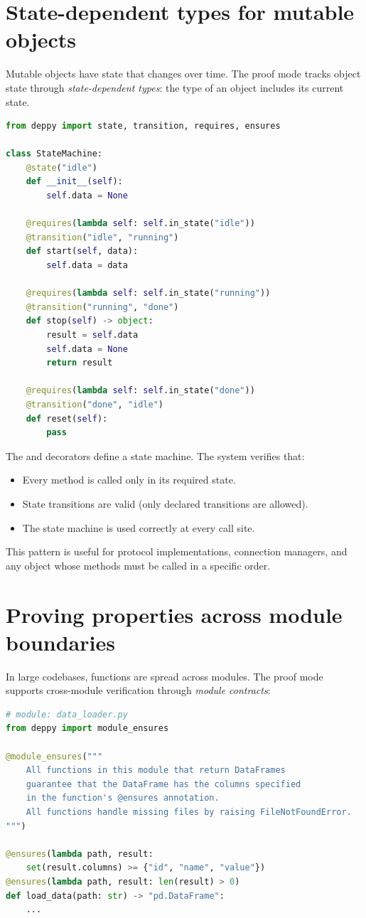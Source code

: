 \documentclass[11pt]{report}
\DeclareRobustCommand{\py}[1]{\texttt{\detokenize{#1}}}
\theoremstyle{definition}
\theoremstyle{plain}
\begin{document}
\section{State-dependent types for mutable objects}

Mutable objects have state that changes over time. The proof mode tracks
object state through \emph{state-dependent types}: the type of an object
includes its current state.

\begin{lstlisting}[style=deppy,language=Python]
from deppy import state, transition, requires, ensures

class StateMachine:
    @state("idle")
    def __init__(self):
        self.data = None

    @requires(lambda self: self.in_state("idle"))
    @transition("idle", "running")
    def start(self, data):
        self.data = data

    @requires(lambda self: self.in_state("running"))
    @transition("running", "done")
    def stop(self) -> object:
        result = self.data
        self.data = None
        return result

    @requires(lambda self: self.in_state("done"))
    @transition("done", "idle")
    def reset(self):
        pass
\end{lstlisting}

The \py{@state} and \py{@transition} decorators define a state machine.
The system verifies that:
\begin{itemize}[nosep]
  \item Every method is called only in its required state.
  \item State transitions are valid (only declared transitions are allowed).
  \item The state machine is used correctly at every call site.
\end{itemize}

This pattern is useful for protocol implementations, connection managers,
and any object whose methods must be called in a specific order.

\section{Proving properties across module boundaries}

In large codebases, functions are spread across modules. The proof mode
supports cross-module verification through \emph{module contracts}:

\begin{lstlisting}[style=deppy,language=Python]
# module: data_loader.py
from deppy import module_ensures

@module_ensures("""
    All functions in this module that return DataFrames
    guarantee that the DataFrame has the columns specified
    in the function's @ensures annotation.
    All functions handle missing files by raising FileNotFoundError.
""")

@ensures(lambda path, result:
    set(result.columns) >= {"id", "name", "value"})
@ensures(lambda path, result: len(result) > 0)
def load_data(path: str) -> "pd.DataFrame":
    ...
\end{lstlisting}
\end{document}
